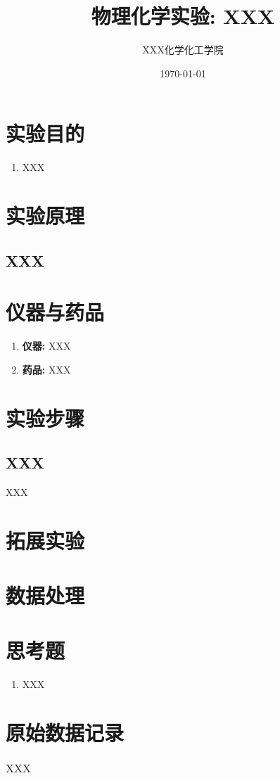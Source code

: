 \documentclass[a4paper]{article}
\title{物理化学实验: XXX}
\author{XXX\quad 123456789\quad 化学化工学院}
\date{\today}
\begin{document}
\maketitle
\section{实验目的}
\begin{enumerate}
\item XXX
\end{enumerate}
\section{实验原理}
\subsection{XXX}
\section{仪器与药品}
\begin{enumerate}
    \item \textbf{仪器:} XXX
    \item \textbf{药品:} XXX
\end{enumerate}
\section{实验步骤}
\subsection{XXX}
XXX
\section{拓展实验}

\newpage
\section{数据处理}

\newpage
\section{思考题}
\begin{enumerate}
	\item XXX
\end{enumerate}
\newpage
\section{原始数据记录}
\begin{table}[H]
	\caption{XXX}
	\begin{center}
		\begin{tabular}{l|l}
			\hline
				&	\\
			\hline
		 \end{tabular}
	\end{center}
\end{table}
\end{document}
